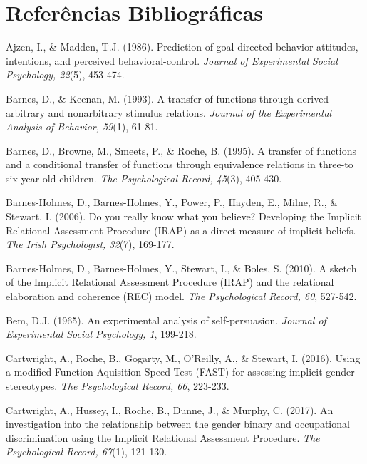 \section*{Referências Bibliográficas}

\hangindent=25pt
\noindent Ajzen, I., \& Madden, T.J. (1986). Prediction of goal-directed behavior-attitudes, intentions, and perceived behavioral-control. \textit{Journal of Experimental Social Psychology, 22}(5), 453-474.

\hangindent=25pt
\noindent Barnes, D., \& Keenan, M. (1993). A transfer of functions through derived arbitrary and nonarbitrary stimulus relations. \textit{Journal of the Experimental Analysis of Behavior, 59}(1), 61-81.

\hangindent=25pt
\noindent Barnes, D., Browne, M., Smeets, P., \& Roche, B. (1995). A transfer of functions and a conditional transfer of functions through equivalence relations in three-to six-year-old children. \textit{The Psychological Record, 45}(3), 405-430.

\hangindent=25pt
\noindent Barnes-Holmes, D., Barnes-Holmes, Y., Power, P., Hayden, E., Milne, R., \& Stewart, I. (2006). Do you really know what you believe? Developing the Implicit Relational Assessment Procedure (IRAP) as a direct measure of implicit beliefs. \textit{The Irish Psychologist, 32}(7), 169-177.

\hangindent=25pt
\noindent Barnes-Holmes, D., Barnes-Holmes, Y., Stewart, I., \& Boles, S. (2010). A sketch of the Implicit Relational Assessment Procedure (IRAP) and the relational elaboration and coherence (REC) model. \textit{The Psychological Record, 60}, 527-542.

\hangindent=25pt
\noindent Bem, D.J. (1965). An experimental analysis of self-persuasion. \textit{Journal of Experimental Social Psychology, 1}, 199-218.

\hangindent=25pt
\noindent Cartwright, A., Roche, B., Gogarty, M., O'Reilly, A., \& Stewart, I. (2016). Using a modified Function Aquisition Speed Test (FAST) for assessing implicit gender stereotypes. \textit{The Psychological Record, 66}, 223-233.

\hangindent=25pt
\noindent Cartwright, A., Hussey, I., Roche, B., Dunne, J., \& Murphy, C. (2017). An investigation into the relationship between the gender binary and occupational discrimination using the Implicit Relational Assessment Procedure. \textit{The Psychological Record, 67}(1), 121-130.

